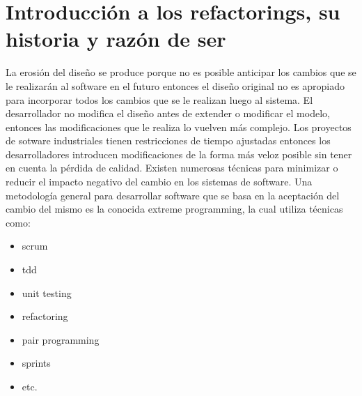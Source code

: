 \section{Introducción a los refactorings, su historia y razón de ser}
La erosión del diseño se produce porque no es posible anticipar los cambios que se le realizarán al
software en el futuro entonces el diseño original no es apropiado para incorporar todos los cambios
que se le realizan luego al sistema. El desarrollador no modifica el diseño antes de extender o
modificar el modelo, entonces las modificaciones que le realiza lo vuelven más complejo. Los
proyectos de sotware industriales tienen restricciones de tiempo ajustadas entonces los desarrolladores
introducen modificaciones de la forma más veloz posible sin tener en cuenta la pérdida de calidad.
Existen numerosas técnicas
para minimizar o reducir el impacto negativo del cambio en los sistemas de software. Una metodología
general para desarrollar software que se basa en la aceptación del cambio del mismo es la conocida
extreme programming, la cual utiliza técnicas como:

\begin{itemize}
    \item scrum
    \item tdd
    \item unit testing
    \item refactoring
    \item pair programming
    \item sprints
    \item etc.
\end{itemize}

